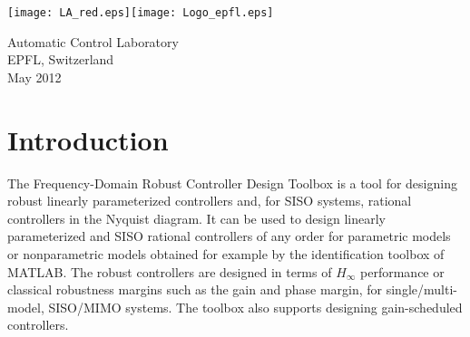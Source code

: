 \documentclass [12pt , a4paper] {report}
\begin{document}


\begin{titlepage}

\vspace{1cm}


\vspace*{0.5cm}

\vspace{6cm}



\vspace{2cm}


\begin{center}

\texttt{[image: LA\_red.eps]}\hspace{5cm}\texttt{[image: Logo\_epfl.eps]}

\vspace*{0.5cm}

{Automatic Control Laboratory\\
EPFL, Switzerland\\
May 2012}
\end{center}
\end{titlepage}


\tableofcontents

\chapter{Introduction}
The Frequency-Domain Robust Controller Design Toolbox is a tool for designing robust linearly parameterized controllers and, for SISO systems, rational controllers in the Nyquist diagram. It can be used to design linearly parameterized and SISO rational controllers of any order for parametric models or nonparametric models obtained for example by the identification toolbox of MATLAB. The robust controllers are designed in terms of $H_\infty$ performance or classical robustness margins such as the gain and phase margin, for single/multi-model, SISO/MIMO systems.  The toolbox also supports designing gain-scheduled controllers. 
\end{document}

